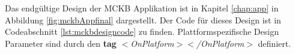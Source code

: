 	Das endgültige Design der MCKB Applikation ist in Kapitel \ref{chap:app} in Abbildung \ref{fig:mckbAppfinal} dargestellt. Der Code für dieses Design ist in Codeabschnitt \ref{lst:mckbdesigncode} zu finden. Plattformspezifische Design Parameter sind durch den \textbf{tag} \textit{$<$OnPlatform$><$/OnPlatform$>$} definiert. 




